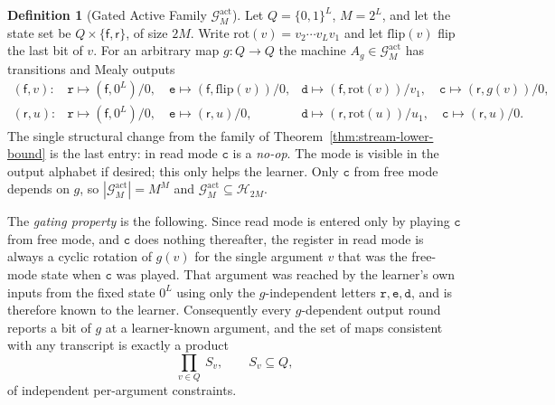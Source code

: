\documentclass[12pt]{article}
\theoremstyle{definition}
\newtheorem{definition}[theorem]{Definition}
\newcommand{\Gact}{\mathcal G^{\mathrm{act}}}
\newcommand{\free}{\mathsf f}
\newcommand{\rd}{\mathsf r}
\newcommand{\rot}{\mathrm{rot}}
\newcommand{\flipl}{\mathrm{flip}}
\begin{document}
\begin{definition}[Gated Active Family $\Gact_M$]
\label{def:gated-active-family}
Let $Q=\{0,1\}^L$, $M=2^L$, and let the state set be $Q\times\{\free,\rd\}$, of
size $2M$.  Write $\rot(v)=v_2\cdots v_Lv_1$ and let $\flipl(v)$ flip the last
bit of $v$.  For an arbitrary map $g:Q\to Q$ the machine $A_g\in\Gact_M$ has
transitions and Mealy outputs
\[
\begin{array}{lll}
(\free,v): &
\mathtt r\mapsto(\free,0^L)/0, \quad
\mathtt e\mapsto(\free,\flipl(v))/0, &
\mathtt d\mapsto(\free,\rot(v))/v_1, \quad
\mathtt c\mapsto(\rd,g(v))/0,\\[3pt]
(\rd,u): &
\mathtt r\mapsto(\free,0^L)/0, \quad
\mathtt e\mapsto(\rd,u)/0, &
\mathtt d\mapsto(\rd,\rot(u))/u_1, \quad
\mathtt c\mapsto(\rd,u)/0 .
\end{array}
\]
The single structural change from the family of
Theorem~\ref{thm:stream-lower-bound} is the last entry: in read mode
$\mathtt c$ is a \emph{no-op}.  The mode is visible in the output alphabet if
desired; this only helps the learner.  Only $\mathtt c$ from free mode depends
on $g$, so $|\Gact_M|=M^M$ and $\Gact_M\subseteq\mathcal H_{2M}$.

The \emph{gating property} is the following.  Since read mode is entered only
by playing $\mathtt c$ from free mode, and $\mathtt c$ does nothing thereafter,
the register in read mode is always a cyclic rotation of $g(v)$ for the single
argument $v$ that was the free-mode state when $\mathtt c$ was played.  That
argument was reached by the learner's own inputs from the fixed state $0^L$
using only the $g$-independent letters $\mathtt r,\mathtt e,\mathtt d$, and is
therefore known to the learner.  Consequently every $g$-dependent output round
reports a bit of $g$ at a learner-known argument, and the set of maps
consistent with any transcript is exactly a product
\[
\prod_{v\in Q}\ S_v,
\qquad
S_v\subseteq Q,
\]
of independent per-argument constraints.
\end{definition}
\end{document}
